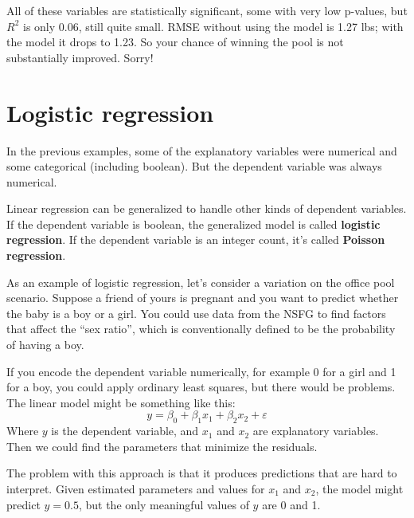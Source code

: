 \documentclass[12pt]{book}
\newcommand{\eps}{\varepsilon}
\theoremstyle{exercise}
\begin{document}
All of these variables are statistically significant, some with
very low p-values, but 
$R^2$ is only 0.06, still quite small.
RMSE without using the model is 1.27 lbs; with the model it drops
to 1.23.  So your chance of winning the pool is not substantially
improved.  Sorry!%
%
%
%
%
%



\section{Logistic regression}

In the previous examples, some of the explanatory variables were
numerical and some categorical (including boolean).  But the dependent
variable was always numerical.%
%
%

Linear regression can be generalized to handle other kinds of
dependent variables.  If the dependent variable is boolean, the
generalized model is called {\bf logistic regression}.  If the dependent
variable is an integer count, it's called {\bf Poisson
regression}.%
%
%
%

As an example of logistic regression, let's consider a variation
on the office pool scenario.
Suppose
a friend of yours is pregnant and you want to predict whether the
baby is a boy or a girl.  You could use data from the NSFG to find
factors that affect the ``sex ratio'', which is conventionally
defined to be the probability
of having a boy.%
%

If you encode the dependent variable numerically, for example 0 for a
girl and 1 for a boy, you could apply ordinary least squares, but
there would be problems.  The linear model might be something like
this:
%
\[ y = \beta_0 + \beta_1 x_1 + \beta_2 x_2 + \eps \]
%
Where $y$ is the dependent variable, and $x_1$ and $x_2$ are
explanatory variables.  Then we could find the parameters that
minimize the residuals.%
%
%
%

The problem with this approach is that it produces predictions that
are hard to interpret.  Given estimated parameters and values for
$x_1$ and $x_2$, the model might predict $y=0.5$, but the only
meaningful values of $y$ are 0 and 1.%
\end{document}
